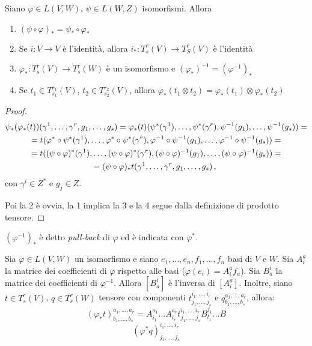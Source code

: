 \begin{proposition}
	Siano $\varphi\in L(V,W)$, $\psi\in L(W,Z)$ isomorfismi. Allora
	\begin{enumerate}
	 \item $(\psi\circ\varphi)_* = \psi_*\circ \varphi_*$
	 \item Se $i:V\to V$ è l'identità, allora $i_*:T_s^r(V) \to T_S^r(V)$ è l'identità
	 \item $\varphi_*:T_s^r(V) \to T_s^r(W)$ è un isomorfismo e $(\varphi_*)^{-1} = (\varphi^{-1})_*$
	 \item Se $t_1\in T_{s_1}^{r_1}(V)$, $t_2\in T_{s_2}^{r_2}(V)$, allora $\varphi_*(t_1\otimes t_2) = \varphi_*(t_1)\otimes \varphi_*(t_2)$
	\end{enumerate}
\end{proposition}
\begin{proof}
	\begin{multline*}
		\psi_*(\varphi_*(t)) (\gamma^1,\dots,\gamma^r,g_1,\dots,g_s) = \varphi_*(t) (\psi^*(\gamma^1),\dots,\psi^*(\gamma^r), \psi^{-1}(g_1),\dots, \psi^{-1}(g_s)) =\\
		= t(\varphi^*\circ \psi^*(\gamma^1),\dots, \varphi^*\circ \psi^*(\gamma^r), \varphi^{-1}\circ \psi^{-1}(g_1), \dots, \varphi^{-1}\circ \psi^{-1}(g_s) ) =\\
		= t((\psi\circ\varphi)^*(\gamma^1),\dots, (\psi\circ\varphi)^*(\gamma^r), (\psi\circ\varphi)^{-1}(g_1), \dots, (\psi\circ\varphi)^{-1}(g_s) ) = \\
		= (\psi\circ\varphi)_* t (\gamma^1,\dots,\gamma^r,g_1,\dots,g_s)\, \text{, }
	\end{multline*}
	con $\gamma^i\in Z^*$ e $g_j\in Z$.
	
	Poi la 2 è ovvia, la 1 implica la 3 e la 4 segue dalla definizione di prodotto tensore.

\end{proof}

\begin{definition}
	$(\varphi^{-1})_*$ è detto \emph{pull-back} di $\varphi$ ed è indicata con $\varphi^*$.
\end{definition}

\begin{proposition}
	Sia $\varphi\in L(V,W)$ un isomorfismo e siano $e_1,\dots,e_n,f_1,\dots,f_n$ basi di $V$ e $W$.
	Sia $A_i^a$ la matrice dei coefficienti di $\varphi$ rispetto alle basi ($\varphi(e_i) = A_i^af_a$).
	Sia $B_a^i$ la matrice dei coefficienti di $\varphi^{-1}$.
	Allora $[B_a^i]$ è l'inversa di $[A_i^a]$. Inoltre, siano $t\in T_s^r(V)$, $q\in T_s^r(W)$ tensore con componenti $t_{j_1,\dots,j_s}^{i_1,\dots,i_r}$ e $q_{b_1,\dots,b_s}^{a_1,\dots,a_r}$, allora:
	\begin{equation*} %
		(\varphi_*t)_{b_1,\dots,b_s}^{a_1,\dots,a_r} = A_{i_1}^{a_1}\dots A_{i_r}^{a_r} t_{j_1,\dots,j_s}^{i_1,\dots,i_r} B_{l_1}^{j_1}\dots B
	\end{equation*}
	\begin{equation*}
		(\varphi^*q)_{j_1,\dots,j_s}^{i_1,\dots,i_r}
	\end{equation*}
\end{proposition}

